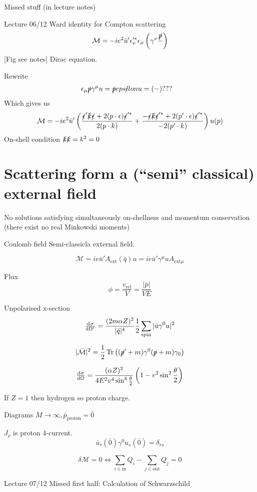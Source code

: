 Missed stuff (in lecture notes)

Lecture 06/12
Ward identity for Compton scattering
\[ \mathcal{M} = -ie^2\bar{u}'\epsilon^{\prime*}_\nu\epsilon_\mu \left(\gamma^\nu \frac{\slashed{p}}{}\right) \]
[Fig see notes]
Dirac equation.

Rewrite
\begin{align*}
\epsilon_\mu\slashed{p}\gamma^\mu u = \slashed{p}\slashed{epsilon}u &= (-) ???
\end{align*}
Which gives us 
\[ \mathcal{M} = -ie^2\bar{u}' \left(\frac{\slashed{\epsilon}'\slashed{k}\slashed{\epsilon} + 2(p\cdot \epsilon)\slashed{\epsilon}^{\prime*}}{2(p\cdot k)} + \frac{-\slashed{\epsilon}\slashed{k}\slashed{\epsilon}^{\prime*} + 2(p'\cdot \epsilon)\slashed{\epsilon}^{\prime*}}{-2(p'\cdot k)}\right)u(p) \]
On-shell condition $\slashed{k}\slashed{k} = k^2 = 0$

\section{Scattering form a (``semi'' classical) external field}
No solutions satisfying simultaneously on-shellness and momentum conservation (there exist no real Minkowski moments)

Coulomb field
Semi-classicla external field.

\[ \mathcal{M} = ie\bar{u}'A_\text{ext}(\bar{q})u = ie \bar{u}'\gamma^\mu u A_{\text{ext}\mu} \]

Flux
\[ \phi = \frac{v_\text{rel}}{V} = \frac{|\bar{p}|}{VE} \]

Unpolarised x-section
\[ \od{\sigma}{\Omega'} = \frac{(2m\alpha Z)^2}{|\bar{q}|^4}\frac{1}{2}\sum_\text{spin}|\bar{u}\gamma^0u|^2 \]

\[ |\bar{\mathcal{M}}|^2 = \frac{1}{2}\operatorname{Tr} \left((\slashed{p}'+m)\gamma^0(\slashed{p}+m)\gamma_0\right) \]


\[ \od{\sigma}{\Omega} = \frac{(\alpha Z)^2}{4E^2v^4\sin^4 \frac{\theta}{2}}\left(1-v^2\sin^2\frac{\theta}{2}\right) \]

If $Z=1$ then hydrogen so proton charge.

Diagrams
$M\to\infty, \bar{p}_\text{proton} = \bar{0}$ 

$J_\nu$ is proton 4-current.
\[ \bar{u}_r(\bar{0})\gamma^0 u_s(\bar{0}) = \delta_{rs} \]

\[ \delta \mathcal{M} = 0 \Leftrightarrow \sum_{i\in\text{in}}Q_i - \sum_{j\in\text{out}}Q_j = 0 \]

Lecture 07/12
Missed first half: Calculation of Schwarzschild

